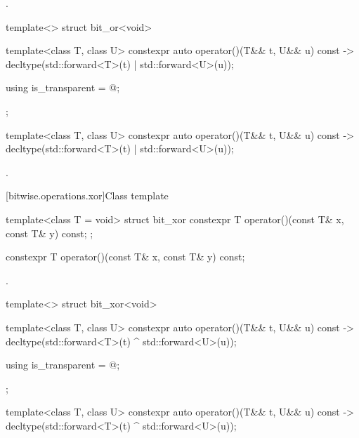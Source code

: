 \begin{itemdescr}
\pnum\returns {}.
\end{itemdescr}

%
\begin{itemdecl}
template<> struct bit_or<void> {
  template<class T, class U> constexpr auto operator()(T&& t, U&& u) const
    -> decltype(std::forward<T>(t) | std::forward<U>(u));

  using is_transparent = @\unspec@;
};
\end{itemdecl}

%
\begin{itemdecl}
template<class T, class U> constexpr auto operator()(T&& t, U&& u) const
    -> decltype(std::forward<T>(t) | std::forward<U>(u));
\end{itemdecl}

\begin{itemdescr}
\pnum\returns {}.
\end{itemdescr}

[bitwise.operations.xor]{Class template }

%
\begin{itemdecl}
template<class T = void> struct bit_xor {
  constexpr T operator()(const T& x, const T& y) const;
};
\end{itemdecl}

%
\begin{itemdecl}
constexpr T operator()(const T& x, const T& y) const;
\end{itemdecl}

\begin{itemdescr}
\pnum\returns {}.
\end{itemdescr}

%
\begin{itemdecl}
template<> struct bit_xor<void> {
  template<class T, class U> constexpr auto operator()(T&& t, U&& u) const
    -> decltype(std::forward<T>(t) ^ std::forward<U>(u));

  using is_transparent = @\unspec@;
};
\end{itemdecl}

%
\begin{itemdecl}
template<class T, class U> constexpr auto operator()(T&& t, U&& u) const
    -> decltype(std::forward<T>(t) ^ std::forward<U>(u));
\end{itemdecl}


